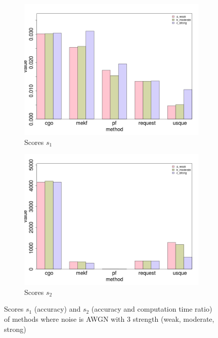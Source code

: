 \begin{figure}[!h]
\begin{subfigure}{.5\textwidth}
\centering
\includegraphics[scale=0.28]{images/histo_s1_add.png}
\caption{Scores $s_1$}
\label{histo_s1_add}
\end{subfigure}

\begin{subfigure}{.5\textwidth}
\centering
\includegraphics[scale=0.28]{images/histo_s2_add.png}
\caption{Scores $s_2$ }
\label{histo_s2_add}
\end{subfigure}
\caption{Scores $s_1$ (accuracy) and $s_2$ (accuracy and computation time ratio) of methods where noise is AWGN with 3 strength (weak, moderate, strong)}
\end{figure}

